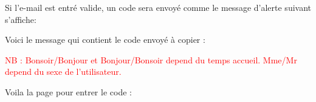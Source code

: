 \documentclass{article}
\begin{document}
\begin{enumerate}
Si l'e-mail est entré valide, un code sera envoyé comme le message d'alerte suivant s'affiche:

\vspace{0.4cm}
\hspace*{-0.7in}
               \noindent{}

Voici le message qui contient le code envoyé à copier :

\textcolor{red}{NB : Bonsoir/Bonjour et Bonjour/Bonsoir depend du temps accueil. Mme/Mr depend du sexe de l'utilisateur.}


\vspace{0.4cm}
\hspace*{-0.7in}
               \noindent{}


Voila la page pour entrer le code :


\end{enumerate}
\end{document}
